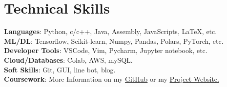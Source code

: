 \documentclass[a4paper,11pt]{article}
\begin{document}
  \section{\textbf{Technical Skills}}
  \begin{itemize}[leftmargin=0.05in, label={}]
    \vspace{1.0mm}
    {\item{
      \textbf{Languages}{: Python, c/c++, Java, Assembly, JavaScripts, LaTeX, etc.} \\
      \textbf{ML/DL}{: Tensorflow, Scikit-learn, Numpy, Pandas, Polars, PyTorch, etc.} \\
      \textbf{Developer Tools}{: VSCode, Vim, Pycharm, Jupyter notebook, etc.} \\
      \textbf{Cloud/Databases}{: Colab, AWS, mySQL.} \\
      \textbf{Soft Skills}{: Git, GUI, line bot, blog.} \\
      \textbf{Coursework}{: More Information on my \href{https://github.com/1chooo}{GitHub} or my \href{https://sites.google.com/g.ncu.edu.tw/1chooo}{Project Website.}} \\
    }}
 \end{itemize}
 \vspace{-16pt}
\end{document}
